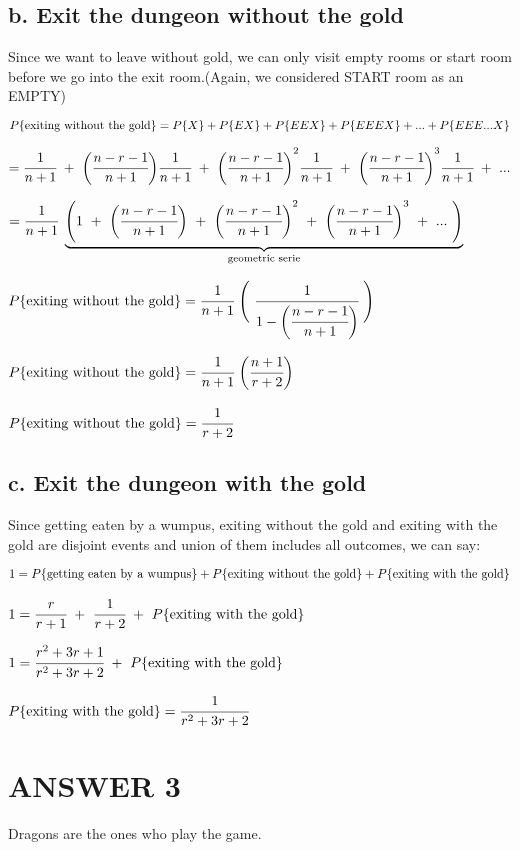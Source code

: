 \documentclass[12pt]{article}
\begin{document}
\subsection*{b. Exit the dungeon without the gold}
Since we want to leave without gold, we can only visit empty rooms or start room before we go into the exit room.(Again, we considered START room as an EMPTY)
\begin{center}
$P\{\textnormal{exiting without the gold}\}=P\{X\}+P\{EX\}+P\{EEX\}+P\{EEEX\}+ ... +P\{EEE...X\}$
\end{center}
\begin{center}
$=\cfrac{1}{n+1}\ +\ \bigg(\cfrac{n-r-1}{n+1}\bigg)\cfrac{1}{n+1}\ +\ {\bigg(\cfrac{n-r-1}{n+1}\bigg)}^{2}\cfrac{1}{n+1}\ +\ {\bigg(\cfrac{n-r-1}{n+1}\bigg)}^{3}\cfrac{1}{n+1}\ +\ ...$
\end{center}
\begin{center}
$=\cfrac{1}{n+1}\ \underbrace{\Bigg({1\ +\ \bigg(\cfrac{n-r-1}{n+1}\bigg)\ +\ \bigg(\cfrac{n-r-1}{n+1}\bigg)}^{2}\ +\ {\bigg(\cfrac{n-r-1}{n+1}\bigg)}^{3}\ +\ ...\ \Bigg)}_\text{geometric serie}$
\end{center}
\begin{center}
$P\{\textnormal{exiting without the gold}\}=\cfrac{1}{n+1}\ \Bigg(\ \cfrac{1}{1-\bigg(\cfrac{n-r-1}{n+1}\bigg)}\ \Bigg)$
\end{center}
\begin{center}
$P\{\textnormal{exiting without the gold}\}=\cfrac{1}{n+1}\ \bigg(\cfrac{n+1}{r+2}\bigg)$
\end{center}
\begin{center}
$P\{\textnormal{exiting without the gold}\}=\cfrac{1}{r+2}$
\end{center}
\subsection*{c. Exit the dungeon with the gold}
Since getting eaten by a wumpus, exiting without the gold and exiting with the gold are disjoint events and union of them includes all outcomes, we can say:\\
\begin{center}
$1 = P\{\textnormal{getting eaten by a wumpus}\}+P\{\textnormal{exiting without the gold}\}+P\{\textnormal{exiting with the gold}\}$
\end{center}
\begin{center}
$1 =\cfrac{r}{r+1}\ +\ \cfrac{1}{r+2} \ +\ P\{\textnormal{exiting with the gold}\}$
\end{center}
\begin{center}
$1 =\cfrac{r^2+3r+1}{r^2+3r+2}\ +\ P\{\textnormal{exiting with the gold}\}$
\end{center}
\begin{center}
$P\{\textnormal{exiting with the gold}\}=\cfrac{1}{r^2+3r+2}\ $
\end{center}
\section*{ANSWER 3}
Dragons are the ones who play the game.
\end{document}
